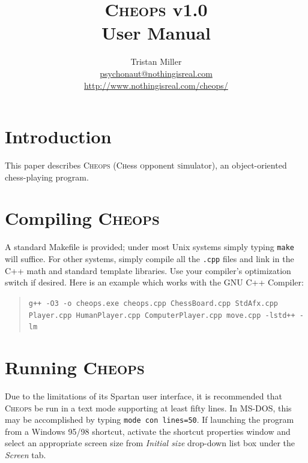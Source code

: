 \documentclass[12pt]{article}
\begin{document}
\title{\textsc{Cheops} v1.0\\User Manual}
\author{Tristan Miller\\ \url{psychonaut@nothingisreal.com}\\ \url{http://www.nothingisreal.com/cheops/}}
\maketitle
\tableofcontents
\pagebreak

\section{Introduction}

This paper describes \textsc{Cheops} (\textsc{Ch}ess \textsc{o}pponent
\textsc{s}imulator), an object-oriented chess-playing program.

\section{Compiling \textsc{Cheops}}

A standard Makefile is provided; under most Unix systems simply typing
\texttt{make} will suffice.  For other systems, simply compile all the
\texttt{.cpp} files and link in the C++ math and standard template
libraries.  Use your compiler's optimization switch if desired.  Here
is an example which works with the GNU C++ Compiler:

\begin{quote}
\texttt{g++ -O3 -o cheops.exe cheops.cpp ChessBoard.cpp StdAfx.cpp Player.cpp HumanPlayer.cpp ComputerPlayer.cpp move.cpp -lstd++ -lm}
\end{quote}

\section{Running \textsc{Cheops}}

Due to the limitations of its Spartan user interface, it is
recommended that \textsc{Cheops} be run in a text mode supporting at
least fifty lines. In MS-DOS, this may be accomplished by typing
\texttt{mode con lines=50}. If launching the program from a Windows
95/98 shortcut, activate the shortcut properties window and select an
appropriate screen size from \emph{Initial size} drop-down list box
under the \emph{Screen} tab.
\end{document}
